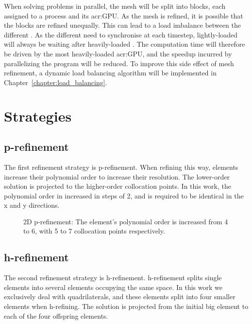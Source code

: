 When solving problems in parallel, the mesh will be split into blocks, each assigned to a process
and its \acrshort{acr:GPU}. As the mesh is refined, it is possible that the blocks are refined
unequally. This can lead to a load imbalance between the different . As the
different  need to synchronise at each timestep, lightly-loaded
 will always be waiting after heavily-loaded . The
computation time will therefore be driven by the most heavily-loaded \acrshort{acr:GPU}, and the
speedup incurred by parallelizing the program will be reduced. To improve this side effect of mesh
refinement, a dynamic load balancing algorithm will be implemented in
Chapter~\ref{chapter:load_balancing}.

\section{Strategies}\label{section:adaptive_mesh_refinement:refinement_strategies}

\subsection{p-refinement}\label{subsection:adaptive_mesh_refinement:refinement_strategies:p-refinement}

The first refinement strategy is p-refinement. When refining this way, elements increase their
polynomial order to increase their resolution. The lower-order solution is projected to the
higher-order collocation points. In this work, the polynomial order in increased in steps of 2, and
is required to be identical in the x and y directions. 

\begin{figure}[H]
	\centering
	
	\caption{2D p-refinement: The element's polynomial order is increased from 4 to 6, with 5 to 7 collocation points respectively.}\label{fig:p-refinement}
\end{figure}

\subsection{h-refinement}\label{subsection:adaptive_mesh_refinement:refinement_strategies:h-refinement}

The second refinement strategy is h-refinement\@. h-refinement splits single elements into several
elements occupying the same space. In this work we exclusively deal with quadrilaterals, and these
elements split into four smaller elements when h-refining. The solution is projected from the
initial big element to each of the four offspring elements.

